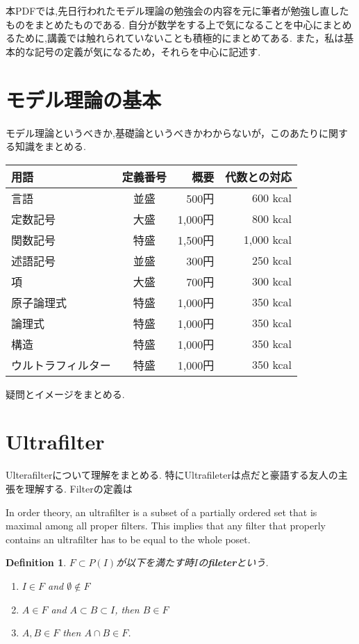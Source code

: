 \documentclass{ujarticle}
\newtheorem{dfn}[thm]{Definition}
\begin{document}
本PDFでは,先日行われたモデル理論の勉強会の内容を元に筆者が勉強し直したものをまとめたものである.
自分が数学をする上で気になることを中心にまとめるために,講義では触れられていないことも積極的にまとめてある.
また，私は基本的な記号の定義が気になるため，それらを中心に記述す.




\section{モデル理論の基本}
\label{sec:モデル理論の基本}
モデル理論というべきか,基礎論というべきかわからないが，このあたりに関する知識をまとめる.
\begin{table}[htb]%
  \begin{tabular}{|l|c|r||r|} \hline
    用語 & 定義番号 & 概要 & 代数との対応 \\ \hline \hline
    言語 & 並盛 & 500円 & 600 kcal \\
    定数記号& 大盛 & 1,000円 & 800 kcal \\
    関数記号 & 特盛 & 1,500円 & 1,000 kcal \\ \hline
    述語記号 & 並盛 & 300円 & 250 kcal \\
    項 & 大盛 & 700円 & 300 kcal \\
    原子論理式 & 特盛 & 1,000円 & 350 kcal \\ \hline
    論理式 & 特盛 & 1,000円 & 350 kcal \\ \hline
    構造 & 特盛 & 1,000円 & 350 kcal \\ \hline
    ウルトラフィルター & 特盛 & 1,000円 & 350 kcal \\ \hline
  \end{tabular}
\end{table}
疑問とイメージをまとめる.

\section{Ultrafilter}
\label{sec:Ultrafilter}
Ulterafilterについて理解をまとめる.
特にUltrafileterは点だと豪語する友人の主張を理解する.
Filterの定義は

In order theory, an ultrafilter is a subset of a partially ordered set
that is maximal among all proper filters.
This implies that any filter that properly contains an ultrafilter has to be equal to the whole poset.

\begin{dfn}
  $F \subset P(I)$が以下を満たす時$I$の\textbf{fileter}という.
  \begin{enumerate}
    \item $ I \in F$ and $ \emptyset \notin F$
    \item $A \in F$ and $A \subset B \subset I$, then $B \in F$
    \item $A,B \in F$ then $A \cap B \in F$.
  \end{enumerate}
\end{dfn}
\end{document}
